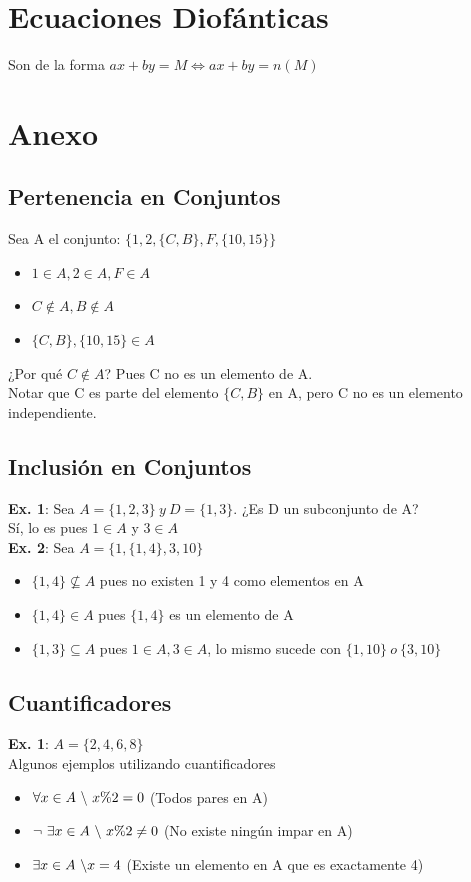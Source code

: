 \documentclass[10pt,a4paper]{article}
\begin{document}
\section*{Ecuaciones Diofánticas}
Son de la forma $ax + by = M \iff ax + by = n(M)$
\section*{Anexo}
\subsection*{Pertenencia en Conjuntos}
\label{subsec:pertenencia_conjuntos}
Sea A el conjunto: $\{1, 2, \{C, B\}, F, \{10, 15\}\}$
\begin{itemize}
    \item $ 1 \in A, 2 \in A, F \in A $
    \item $ C \notin A, B \notin A $
    \item $  \{C, B\}, \{10, 15\} \in A $
\end{itemize}
¿Por qué $C \notin A$? Pues C no es un elemento de A.\\ Notar que C es parte del elemento $\{C, B\}$ en A, pero C no es un elemento independiente.
\subsection*{Inclusión en Conjuntos}
\label{subsec:inclusion_conjuntos}
\textbf{Ex. 1}: Sea $A = \{1, 2, 3\} \ y \ D = \{1, 3\}$. ¿Es D un subconjunto de A? \\
Sí, lo es pues $1 \in A$ y $ 3 \in A$ \\
\textbf{Ex. 2}: Sea $A = \{1, \{1, 4\}, 3, 10\}$
\begin{itemize}
    \item $ \{1, 4\} \nsubseteq A $ pues no existen 1 y 4 como elementos en A
    \item $ \{1, 4\} \in A $ pues $\{1, 4\}$ es un elemento de A
    \item $\{1, 3\} \subseteq A$ pues $ 1 \in A, 3 \in A$, lo mismo sucede con $ \{1, 10\} \ o \ \{3, 10\}$
\end{itemize}
\subsection*{Cuantificadores}
\label{subsec:cuantificadores}
\textbf{Ex. 1}: $A = \{2, 4, 6, 8\}$ \\
Algunos ejemplos utilizando cuantificadores 
\begin{itemize}
    \item $\forall x \in A \ \symbol{92} \ x \% 2 = 0$ (Todos pares en A)
    \item $\neg \ \exists x \in A \ \symbol{92} \ x \% 2 \neq 0$ (No existe ningún impar en A) 
    \item $ \exists x \in A \ \symbol{92} x = 4$ (Existe un elemento en A que es exactamente 4)
\end{itemize}
\end{document}
